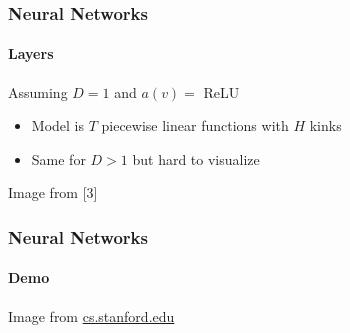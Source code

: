 \documentclass[xetex,professionalfont]{beamer}
\begin{document}
\begin{frame}
  \frametitle{Neural Networks}
  \framesubtitle{Layers}
  
  Assuming $D=1$ and $a(v)=$ ReLU
  \begin{itemize}
    \item Model is $T$ piecewise linear functions with $H$ kinks
    \item Same for $D>1$ but hard to visualize
  \end{itemize}

  \medskip

  \begin{center}
    {\centering Image from [3]}
\end{center}
  
  \end{frame}


\begin{frame}
\frametitle{Neural Networks}
\framesubtitle{Demo}

\begin{center}
    {\centering Image from \href{http://cs.stanford.edu/people/karpathy/convnetjs/demo/classify2d.html}{cs.stanford.edu}} %
\end{center}

\end{frame}
\end{document}
